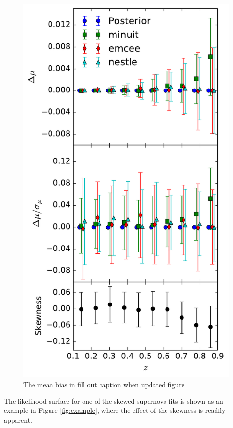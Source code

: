 \documentclass[a4paper,fleqn,usenatbib]{mnras}
\newcommand{\red}{\color{red}}
\begin{document}
\begin{figure}
	\includegraphics[width=\columnwidth]{../output/bias_dessky_deep.pdf}
	\caption{The mean bias in {\red fill out caption when updated figure}}
	\label{fig:bias_des_deep}
\end{figure}
The likelihood surface for one of the skewed supernova fits is shown as an example in Figure \ref{fig:example}, where the effect of the skewness is readily apparent.
\end{document}
